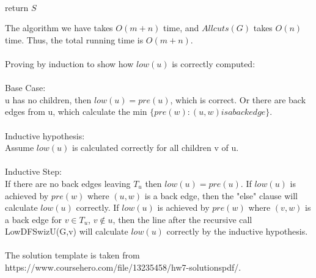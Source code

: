 \documentclass[11pt]{article}
\begin{document}
\begin{solution}
\begin{enumerate}[(a)]
\begin{center}
\begin{algorithm}
				\\ 		return $S$\-
			\end{algorithm}
		\end{center}
	\end{enumerate}
	The algorithm we have takes $O(m+n)$ time, and $Allcuts(G)$ takes $O(n)$ time. Thus, the total running time is $O(m+n)$.\\
	\\
	Proving by induction to show how $low(u)$ is correctly computed:\\
	\\
	Base Case:\\
	u has no children, then $low(u) = pre(u)$, which is correct. Or there are back edges from u, which calculate the min $\{pre(w):(u,w) is a back edge\}$.\\
	\\
	Inductive hypothesis:\\
	Assume $low(u)$ is calculated correctly for all children v of u.\\
	\\
	Inductive Step:\\
	If there are no back edges leaving $T_u$ then $low(u) = pre(u)$. If $low(u)$ is achieved by $pre(w)$ where $(u,w)$ is a back edge, then the "else" clause will calculate $low(u)$ correctly. If $low(u)$ is achieved by $pre(w)$ where $(v,w)$ is a back edge for $v \in T_u$, $v \notin u$, then the line after the recursive call LowDFSwizU(G,v) will calculate $low(u)$ correctly by the inductive hypothesis.\\
	\\
The solution template is taken from\\ https://www.coursehero.com/file/13235458/hw7-solutionspdf/.\\
\end{solution}
\end{document}
